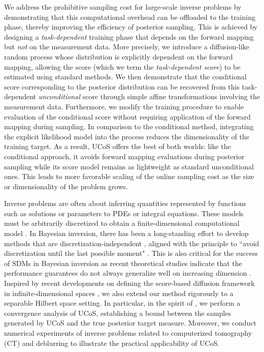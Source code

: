 \documentclass[10pt]{article} %
\theoremstyle{plain}
\theoremstyle{definition}
\theoremstyle{remark}
\newcommand{\fabian}[1]{{#1}}%
\newcommand{\lam}[1]{{ #1}}
\begin{document}
We address the prohibitive sampling cost for large-scale inverse problems by demonstrating that this computational overhead can be offloaded to the training phase, thereby\lam{improving the efficiency of posterior sampling}. This is achieved by designing a \emph{task-dependent} training phase that depends on the forward mapping but \emph{not} on the measurement data. More precisely, we introduce a diffusion-like random process whose distribution is explicitly dependent on the forward mapping, allowing the score (which we term the \emph{task-dependent score}) to be estimated using standard methods. We then demonstrate that the conditional score corresponding to the posterior distribution can be recovered from this task-dependent \emph{unconditional} score through simple affine transformations involving the measurement data. Furthermore, we modify the training procedure to enable evaluation of the conditional score without requiring application of the forward mapping during sampling.  In comparison to the conditional method, \lam{integrating the explicit likelihood model into the process reduces the dimensionality of the training target. As a result, UCoS offers the best of both worlds: \fabian{like the conditional approach,} it avoids forward mapping evaluations during posterior sampling while its score model remains as lightweight as standard unconditional ones. This leads to more favorable scaling of the online sampling cost as the size or dimensionality of the problem grows. }

Inverse problems are often about inferring quantities represented by functions such as solutions or parameters to PDEs \fabian{or integral equations. These models must be arbitrarily discretized to obtain a finite-dimensional computational model \cite{Mueller2012Linearandnonlinear}}. In Bayesian inversion, there has been a long-standing effort to develop methods that are discretization-independent \cite{lehtinen1989linear, lassas2004can, lassas2009}, aligned with the principle to ``avoid discretization until the last possible moment" \cite{stuart2010inverse}. This is also critical for the success of SDMs in Bayesian inversion as recent theoretical studies indicate that the performance guarantees do not always generalize well on increasing dimension \cite{chen2022sampling, de2022convergence, pidstrigach2023infinitedimensional}. Inspired by recent developments on defining the score-based diffusion framework in infinite-dimensional spaces \cite{pidstrigach2023infinitedimensional, baldassari2024conditional}, we also extend our method rigorously to a separable Hilbert space setting. In particular, in the spirit of \citet{pidstrigach2023infinitedimensional}, we perform a convergence analysis of UCoS, establishing a bound between the samples generated by UCoS and the true posterior target measure. Moreover, we conduct numerical experiments of inverse problems related to computerized tomography (CT) \fabian{and deblurring} to illustrate the practical applicability of UCoS.
\end{document}
